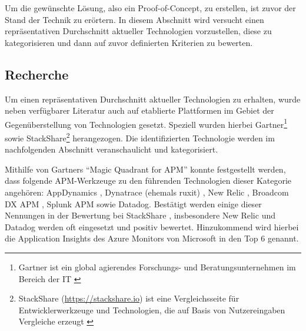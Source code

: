 
%
%

Um die gewünschte Lösung, also ein Proof-of-Concept, zu erstellen, ist zuvor der Stand der Technik zu erörtern. In diesem Abschnitt wird versucht einen repräsentativen Durchschnitt aktueller Technologien vorzustellen, diese zu kategorisieren und dann auf zuvor definierten Kriterien zu bewerten.

\subsection{Recherche}

Um einen repräsentativen Durchschnitt aktueller Technologien zu erhalten, wurde neben verfügbarer Literatur auch auf etablierte Plattformen im Gebiet der Gegenüberstellung von Technologien gesetzt. Speziell wurden hierbei Gartner\footnote{Gartner ist ein global agierendes Forschungs- und Beratungsunternehmen im Bereich der IT \cite{GartnerDefinition}} sowie StackShare\footnote{StackShare (\url{https://stackshare.io}) ist eine Vergleichsseite für Entwicklerwerkzeuge und Technologien, die auf Basis von Nutzereingaben Vergleiche erzeugt \cite{StackshareDefinition}} herangezogen. Die identifizierten Technologie werden im nachfolgenden Abschnitt veranschaulicht und kategorisiert. 

Mithilfe von Gartners \enquote{Magic Quadrant for APM} \cite{GartnerMagicQuadrantForAPM} konnte festgestellt werden, dass folgende APM-Werkzeuge zu den führenden Technologien dieser Kategorie angehören: AppDynamics \cite{AppDynamics}, Dynatrace (ehemals ruxit) \cite{Dynatrace}, New Relic \cite{NewRelic}, Broadcom DX APM \cite{BroadcomDXAPM}, Splunk APM \cite{SplunkAPM} sowie Datadog\cite{Datadog}. Bestätigt werden einige dieser Nennungen in der Bewertung bei StackShare \cite{StackShareAPM}, insbesondere New Relic und Datadog werden oft eingesetzt und positiv bewertet. Hinzukommend wird hierbei die Application Insights \cite{AzureApplicationInsights} des Azure Monitors von Microsoft in den Top 6 genannt.

